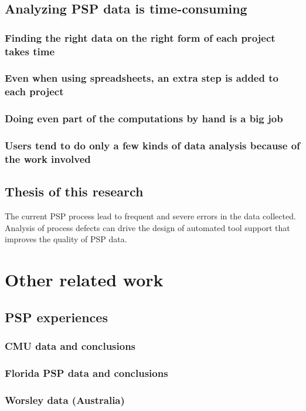 \section{Analyzing PSP data is time-consuming}
\subsection{Finding the right data on the right form of each project takes time}
\subsection{Even when using spreadsheets, an extra step is added to each project}
\subsection{Doing even part of the computations by hand is a big job}
\subsection{Users tend to do only a few kinds of data analysis because of the work involved}
\section{Thesis of this research}

The current PSP process lead to frequent and severe errors in the data
collected.  Analysis of process defects can drive the design of automated
tool support that improves the quality of PSP data.

\chapter{Other related work}
\section{PSP experiences}
\subsection{CMU data and conclusions}
\subsection{Florida PSP data and conclusions}
\subsection{Worsley data (Australia)}
